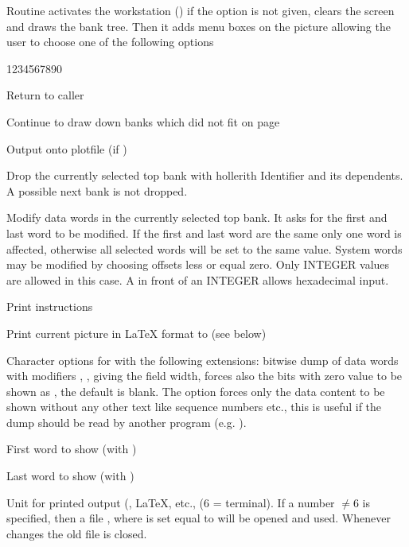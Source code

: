 Routine  activates the workstation () if
the  option is not given, clears
the screen and draws the bank tree. 
Then it adds menu boxes on the picture allowing the user 
to choose one of the following options
\begin{DLtt}{1234567890}
\item[Quit]       Return to caller
\item[Cont]       Continue to draw down banks which did not fit on page
\item[=>plotfile] Output onto plotfile (if )
\item[Drop bank(tree) IDBK\ ]
                  Drop the currently selected top bank with hollerith 
                  Identifier  and its dependents. 
                  A possible next bank is not dropped.
\item[Modify data in bank IDBK\ ]
                  Modify data words in the currently selected top bank. 
                  It asks for the first and last word to be modified. 
                  If the first and last word are the same only one word 
                  is affected, otherwise all selected words will be set
                  to the same value. 
                  System words may be modified by choosing offsets less
                  or equal zero.
                  Only INTEGER values are allowed in this case.
                  A \Lit{$} in front of an INTEGER allows hexadecimal input.
\item[Help]       Print instructions
\item[=>LaTeX]    Print current picture in \LaTeX{} format to  (see below)
\item[CHOPT]      Character options for  with the
                  following extensions: 
                   bitwise dump of data words with
                  modifiers , ,  giving the field width, 
                   forces also the bits with zero value to be shown as , 
                  the default is blank. 
                  The option  forces only the data content to be shown 
                  without any other text like sequence numbers etc., 
                  this is useful if the dump should be read by another
                  program (e.g. ).
\item[FIRST]      First word to show (with )
\item[LAST]       Last word to show (with )
\item[UNIT]       Unit for printed output (, \LaTeX, etc.,  (6 = terminal).
                  If a number $\neq 6$ is specified, then a file
                  , where  is set equal to  
                  will be opened and used. 
                  Whenever  changes the old file is closed.
\end{DLtt}
 
